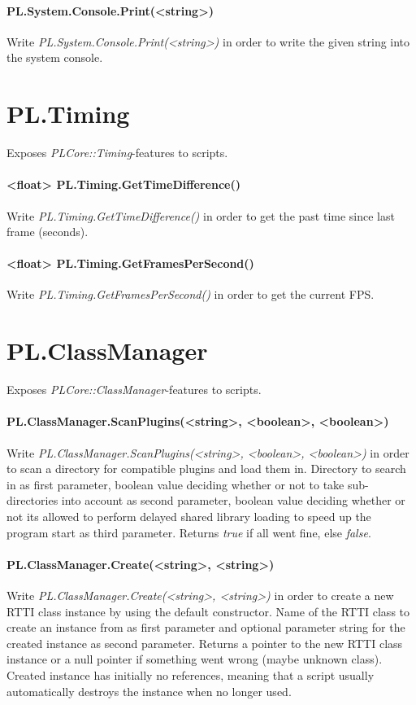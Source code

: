 \paragraph{PL.System.Console.Print(<string>)}
Write \emph{PL.System.Console.Print(<string>)} in order to write the given string into the system console.




\section{PL.Timing}
Exposes \emph{PLCore::Timing}-features to scripts.

\paragraph{<float> PL.Timing.GetTimeDifference()}
Write \emph{PL.Timing.GetTimeDifference()} in order to get the past time since last frame (seconds).

\paragraph{<float> PL.Timing.GetFramesPerSecond()}
Write \emph{PL.Timing.GetFramesPerSecond()} in order to get the current \ac{FPS}.




\section{PL.ClassManager}
Exposes \emph{PLCore::ClassManager}-features to scripts.

\paragraph{PL.ClassManager.ScanPlugins(<string>, <boolean>, <boolean>)}
Write \emph{PL.ClassManager.ScanPlugins(<string>, <boolean>, <boolean>)} in order to scan a directory for compatible plugins and load them in. Directory to search in as first parameter, boolean value deciding whether or not to take sub-directories into account as second parameter, boolean value deciding whether or not its allowed to perform delayed shared library loading to speed up the program start as third parameter. Returns \emph{true} if all went fine, else \emph{false}.

\paragraph{PL.ClassManager.Create(<string>, <string>)}
Write \emph{PL.ClassManager.Create(<string>, <string>)} in order to create a new RTTI class instance by using the default constructor. Name of the RTTI class to create an instance from as first parameter and optional parameter string for the created instance as second parameter. Returns a pointer to the new RTTI class instance or a null pointer if something went wrong (maybe unknown class). Created instance has initially no references, meaning that a script usually automatically destroys the instance when no longer used.

